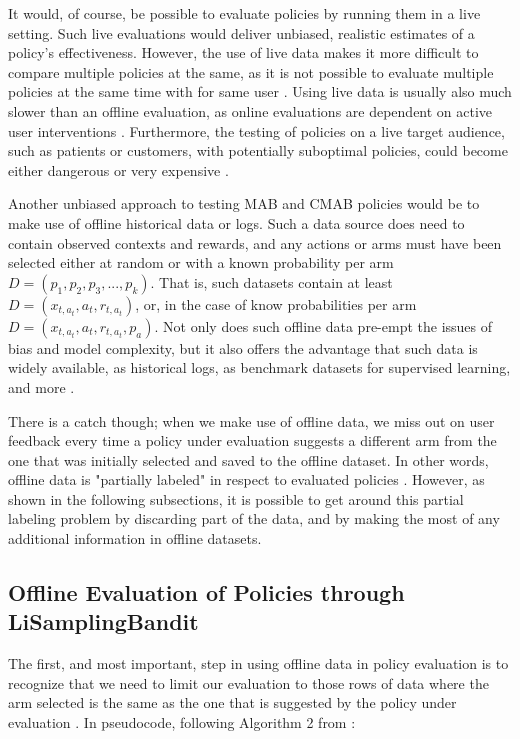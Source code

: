 \documentclass{jss}
\begin{document}
It would, of course, be possible to evaluate policies by running them in a live setting. Such live evaluations would deliver unbiased, realistic estimates of a policy's effectiveness. However, the use of live data makes it more difficult to compare multiple policies at the same, as it is not possible to evaluate multiple policies at the same time with for same user \citep{Mandel2016}. Using live data is usually also much slower than an offline evaluation, as online evaluations are dependent on active user interventions \citep{Tewari2017}. Furthermore, the testing of policies on a live target audience, such as patients or customers, with potentially suboptimal policies, could become either dangerous or very expensive \citep{Bastani2015}.

Another unbiased approach to testing MAB and CMAB policies would be to make use of offline historical data or logs. Such a data source does need to contain observed contexts and rewards, and any actions or arms must have been selected either at random or with a known probability per arm \( D = (p_1,p_2,p_3,...,p_k) \). That is, such datasets contain at least \( D = (x_{t,a_t},a_{t},r_{t,a_t}) \), or, in the case of know probabilities per arm \( D = (x_{t,a_t},a_{t},r_{t,a_t},p_a) \). Not only does such offline data pre-empt the issues of bias and model complexity, but it also offers the advantage that such data is widely available, as historical logs, as benchmark datasets for supervised learning, and more \citep{Li2011}.

There is a catch though; when we make use of offline data, we miss out on user feedback every time a policy under evaluation suggests a different arm from the one that was initially selected and saved to the offline dataset. In other words, offline data is "partially labeled" in respect to evaluated  policies \citep{Strehl2010}. However, as shown in the following subsections, it is possible to get around this partial labeling problem by discarding part of the data, and by making the most of any additional information in offline datasets.

\subsection{Offline Evaluation of Policies through LiSamplingBandit} \label{offli}

The first, and most important, step in using offline data in policy evaluation is to recognize that we need to limit our evaluation to those rows of data where the arm selected is the same as the one that is suggested by the policy under evaluation \citep{Li2012,Li2011}. In pseudocode, following Algorithm 2 from \citep{Li2011}:
\end{document}
